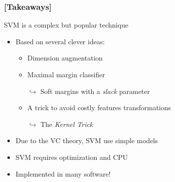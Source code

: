 \documentclass[xcolor=x11names,compress, handhouts]{beamer}
\renewcommand{\(}{\begin{columns}}
\renewcommand{\)}{\end{columns}}
\newcommand{\<}[1]{\begin{column}{#1}}
\renewcommand{\>}{\end{column}}
\begin{document}
\begin{frame} %
\frametitle{\textcolor{brique}{[Takeaways]}}
SVM is a complex but popular technique
\begin{itemize}[<+->]
\item Based on several clever ideas:
\begin{itemize}[<+->]
    \item Dimension augmentation
    \item Maximal margin classifier
    \item[$\hookrightarrow$] Soft margins with a \textit{slack} parameter
    \item A trick to avoid costly features transformations
    \item[$\hookrightarrow$] The \textit{Kernel Trick}
    \end{itemize}
\item Due to the VC theory, SVM use simple models 
\item SVM requires optimization and CPU
\item Implemented in many software!
\end{itemize}
\end{frame}
\end{document}

